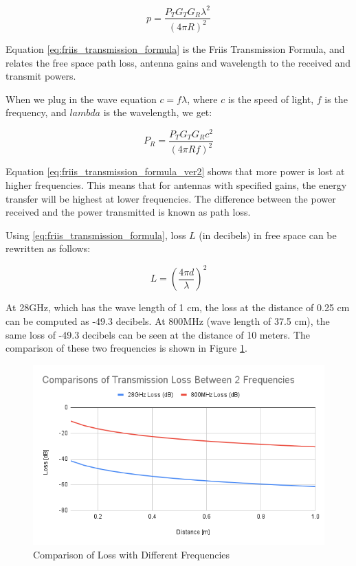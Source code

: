 \documentclass[a4paper,12pt]{report}
\begin{document}
\begin{equation} \label{eq:friis_transmission_formula}
  p = \frac{P_T G_T G_R \lambda^2}{(4\pi R)^2}
\end{equation}

Equation \ref{eq:friis_transmission_formula} is the
Friis Transmission Formula, and relates the free space path loss,
antenna gains and wavelength to the received and transmit powers.

When we plug in the wave equation $c = f\lambda$,
where $c$ is the speed of light, $f$ is the frequency,
and $lambda$ is the wavelength, we get:

\begin{equation} \label{eq:friis_transmission_formula_ver2}
  P_R = \frac{P_T G_T G_R c^2}{(4\pi R f)^2}
\end{equation}

Equation \ref{eq:friis_transmission_formula_ver2}
shows that more power is lost at higher frequencies.
This means that for antennas with specified gains,
the energy transfer will be highest at lower frequencies.
The difference between the power received and
the power transmitted is known as path loss.

Using \ref{eq:friis_transmission_formula},
loss $L$ (in decibels) in free space can be rewritten as follows:

\begin{equation}
  L = \left(\frac{4\pi d}{\lambda} \right)^2
\end{equation}

At 28GHz, which has the wave length of 1 cm,
the loss at the distance of 0.25 cm can be computed as -49.3 decibels.
At 800MHz (wave length of 37.5 cm), the same loss of -49.3 decibels can be seen at
the distance of 10 meters.
The comparison of these two frequencies is shown in Figure \ref{fig:loss_comparison}.

\begin{figure}
  \begin{center}
    \includegraphics[clip, keepaspectratio, width=0.7\linewidth]{img/loss_comparison.png}
    \caption{Comparison of Loss with Different Frequencies}
    \label{fig:loss_comparison}
  \end{center}
\end{figure}
\end{document}
